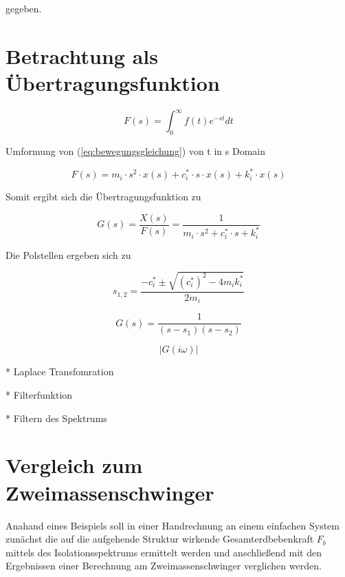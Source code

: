 gegeben.

\pagebreak

\section{Betrachtung als Übertragungsfunktion}
\label{sec:ubertragungsfunktion}

\begin{equation} \label{laplace}
F(s) = \int_{0}^{\infty} f(t)e^{-st}dt
\end{equation}

Umformung von (\cref{eq:bewegungsgleichung}) von t in s Domain

\begin{equation} \label{laplace1}
F(s) = m_i \cdot s^2 \cdot x(s) + c_i^* \cdot s \cdot x(s) + k_i^* \cdot x(s)
\end{equation}

Somit ergibt sich die Übertragungsfunktion zu

\begin{equation} \label{laplace2}
G(s)=\frac{X(s)}{F(s)} = \frac{1}{m_i \cdot s^2 + c_i^* \cdot s + k_i^*}
\end{equation}

Die Polstellen ergeben sich zu

\begin{equation} \label{laplace-pole}
s_{1,2} = \frac{-c_i^* \pm \sqrt{(c_i^*)^2 - 4m_ik_i^*}}{2m_i}
\end{equation}

\begin{equation} \label{laplace3}
G(s)=\frac{1}{(s-s_1)(s-s_2)}
\end{equation}

\begin{equation} \label{laplace-attan}
|G(i\omega)|
\end{equation}

* Laplace Transfomration

* Filterfunktion

* Filtern des Spektrums

\pagebreak

\section{Vergleich zum Zweimassenschwinger}
\label{sec:vergleich}

Anahand eines Beispiels soll in einer Handrechnung an einem einfachen System zunächst die auf die aufgehende Struktur wirkende Gesamterdbebenkraft $F_b$ mittels des Isolationsspektrums ermittelt werden und anschließend mit den Ergebnissen einer Berechnung am Zweimassenschwinger verglichen werden.

